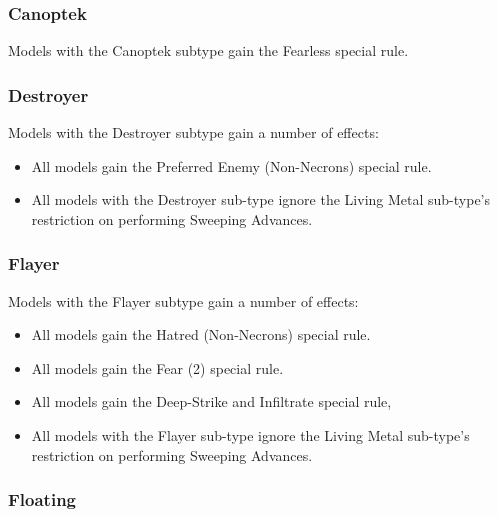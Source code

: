 \subsubsection{Canoptek} \label{Canoptek}

Models with the Canoptek subtype gain the Fearless special rule. \\

\subsubsection{Destroyer} \label{Destroyer}

Models with the Destroyer subtype gain a number of effects:

\begin{itemize}
	\item All models gain the Preferred Enemy (Non-Necrons) special rule. \\
	\item All models with the Destroyer sub-type ignore the Living Metal sub-type's restriction on performing Sweeping Advances. \\
\end{itemize}

\subsubsection{Flayer} \label{Flayer}

Models with the Flayer subtype gain a number of effects:

\begin{itemize}
	\item All models gain the Hatred (Non-Necrons) special rule. \\
	\item All models gain the Fear (2) special rule. \\
	\item All models gain the Deep-Strike and Infiltrate special rule, \\
	\item All models with the Flayer sub-type ignore the Living Metal sub-type's restriction on performing Sweeping Advances. \\
\end{itemize}

\subsubsection{Floating} \label{Floating}

